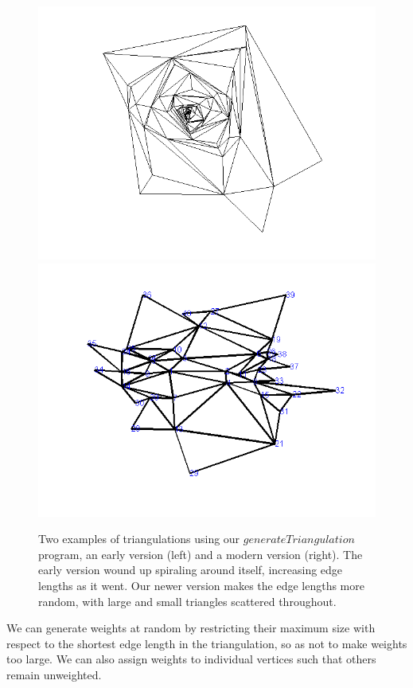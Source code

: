 \documentclass[12pt]{article}
\begin{document}
\begin{figure}
\centering
\includegraphics[scale = 0.45]{Pictures3/gentri.png}
\includegraphics[scale = 0.45]{Pictures3/gentri6.png}
\caption{Two examples of triangulations using our $generateTriangulation$ program, an early version (left) and a modern version (right). The early version wound up spiraling around itself, increasing edge lengths as it went. Our newer version makes the edge lengths more random, with large and small triangles scattered throughout.}
\label{genTris}
\end{figure}

 We can generate weights at random by restricting their maximum size with respect to the shortest edge length in the triangulation, so as not to make weights too large. We can also assign weights to individual vertices such that others remain unweighted. 
\end{document}
